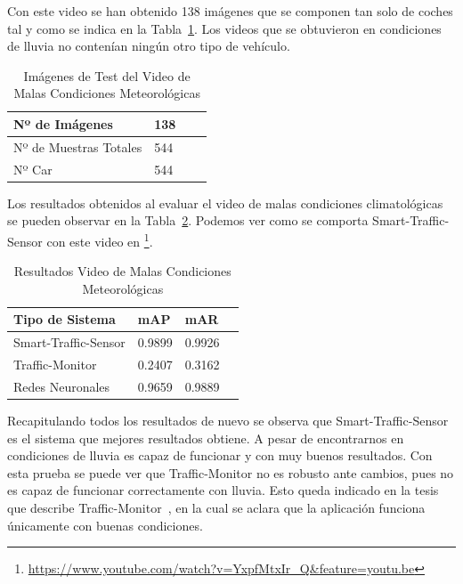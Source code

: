 Con este video se han obtenido 138 imágenes que se componen tan solo de coches tal y como se indica en la Tabla~\ref{tabla_video_malas_condiciones}. Los videos que se obtuvieron en condiciones de lluvia no contenían ningún otro tipo de vehículo.

\begin{table}[htbp][H] 
\begin{center}
\begin{tabular}{|l|l|l|l|}
\hline
Nº de Imágenes  & 138 \\
\hline \hline
Nº de Muestras Totales & 544\\ \hline
Nº Car & 544 \\ \hline
\end{tabular}
\caption{Imágenes de Test del Video de Malas Condiciones Meteorológicas}
\label{tabla_video_malas_condiciones}
\end{center}
\end{table}

Los resultados obtenidos al evaluar el video de malas condiciones climatológicas se pueden observar en la Tabla~\ref{resultados_video_malas_condiciones}. Podemos ver como se comporta Smart-Traffic-Sensor con este video en \footnote{\url{https://www.youtube.com/watch?v=YxpfMtxIr_Q&feature=youtu.be}}.

\begin{table}[htbp][H] 
\begin{center}
\begin{tabular}{|l|l|l|l|}
\hline
Tipo de Sistema & mAP & mAR  \\ 
\hline \hline
Smart-Traffic-Sensor & 0.9899 & 0.9926 \\ \hline
Traffic-Monitor & 0.2407 & 0.3162 \\ \hline
Redes Neuronales & 0.9659 & 0.9889\\ \hline
\end{tabular}
\caption{Resultados Video de Malas Condiciones Meteorológicas}
\label{resultados_video_malas_condiciones}
\end{center}
\end{table}

Recapitulando todos los resultados de nuevo se observa que Smart-Traffic-Sensor es el sistema que mejores resultados obtiene. A pesar de encontrarnos en condiciones de lluvia es capaz de funcionar y con muy buenos resultados. Con esta prueba se puede ver que Traffic-Monitor no es robusto ante cambios, pues no es capaz de funcionar correctamente con lluvia. Esto queda indicado en la tesis que describe Traffic-Monitor~\cite{redo_tesis}, en la cual se aclara que la aplicación funciona únicamente con buenas condiciones.

